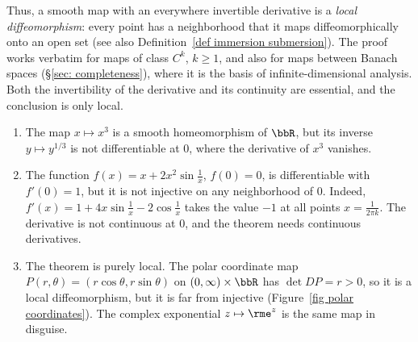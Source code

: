 Thus, a smooth map with an everywhere invertible derivative is a \emph{local diffeomorphism}: every point has a neighborhood that it maps diffeomorphically onto an open set (see also Definition~\ref{def immersion submersion}). The proof works verbatim for maps of class $C^k$, $k\geq1$, and also for maps between Banach spaces (\S\ref{sec: completeness}), where it is the basis of infinite-dimensional analysis. Both the invertibility of the derivative and its continuity are essential, and the conclusion is only local.

\begin{example}\label{example InMT hypotheses}
    \begin{enumerate}
        \item The map $x\mapsto x^3$ is a smooth homeomorphism of $\bbR$, but its inverse $y\mapsto y^{1/3}$ is not differentiable at $0$, where the derivative of $x^3$ vanishes.
        \item The function $f(x)=x+2x^2\sin\frac1x$, $f(0)=0$, is differentiable with $f'(0)=1$, but it is not injective on any neighborhood of $0$. Indeed, $f'(x)=1+4x\sin\frac1x-2\cos\frac1x$ takes the value $-1$ at all points $x=\frac1{2\pi k}$. The derivative is not continuous at $0$, and the theorem needs continuous derivatives.
        \item The theorem is purely local. The polar coordinate map $P(r,\theta)=(r\cos\theta,r\sin\theta)$ on $(0,\infty)\times\bbR$ has $\det DP=r>0$, so it is a local diffeomorphism, but it is far from injective (Figure~\ref{fig polar coordinates}). The complex exponential $z\mapsto\rme^z$ is the same map in disguise.
    \end{enumerate}
\end{example}


